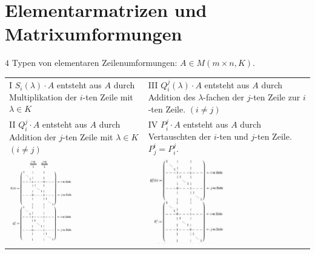 \documentclass[12pt,a4paper]{article}
\theoremstyle{plain}
\numberwithin{equation}{section}
\begin{document}
\section{Elementarmatrizen und Matrixumformungen}
$4$ Typen von elementaren Zeilenumformungen: $A\in M(m\times n,K)$. \\
\begin{tabular}{p{} p{}}
I $S_i(\lambda)\cdot A$ entsteht aus $A$ durch Multiplikation der $i$-ten Zeile mit $\lambda \in K$ & III $Q^j_i(\lambda)\cdot A$ entsteht aus $A$ durch Addition des $\lambda$-fachen der $j$-ten Zeile zur $i$-ten Zeile. $(i\neq j)$ \\ II $Q^j_i\cdot A$ entsteht aus $A$ durch Addition der $j$-ten Zeile mit $\lambda \in K$ $(i\neq j)$ & IV $P^j_i\cdot A$ entsteht aus $A$ durch Vertauschten der $i$-ten und $j$-ten Zeile. $P^i_j=P^j_i$. \\
\includegraphics[width= 0.48\textwidth]{pics/ElMa1.png} & \includegraphics[width= 0.48\textwidth]{pics/ElMa2.png}
\end{tabular}
\end{document}
